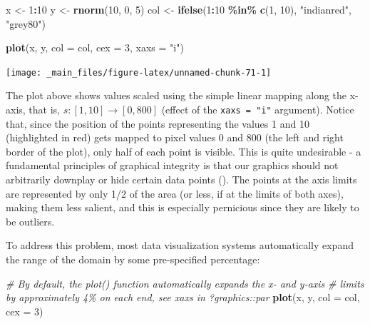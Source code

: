 \documentclass[
]{book}
\newenvironment{Shaded}{\begin{snugshade}}{\end{snugshade}}
\newcommand{\AttributeTok}[1]{\textcolor[rgb]{0.13,0.29,0.53}{#1}}
\newcommand{\CommentTok}[1]{\textcolor[rgb]{0.56,0.35,0.01}{\textit{#1}}}
\newcommand{\DecValTok}[1]{\textcolor[rgb]{0.00,0.00,0.81}{#1}}
\newcommand{\FunctionTok}[1]{\textcolor[rgb]{0.13,0.29,0.53}{\textbf{#1}}}
\newcommand{\NormalTok}[1]{#1}
\newcommand{\OtherTok}[1]{\textcolor[rgb]{0.56,0.35,0.01}{#1}}
\newcommand{\SpecialCharTok}[1]{\textcolor[rgb]{0.81,0.36,0.00}{\textbf{#1}}}
\newcommand{\StringTok}[1]{\textcolor[rgb]{0.31,0.60,0.02}{#1}}
\theoremstyle{definition}
\theoremstyle{definition}
\theoremstyle{definition}
\theoremstyle{definition}
\theoremstyle{remark}
\begin{document}
\begin{Shaded}
\begin{Highlighting}[]
\NormalTok{x }\OtherTok{\textless{}{-}} \DecValTok{1}\SpecialCharTok{:}\DecValTok{10}
\NormalTok{y }\OtherTok{\textless{}{-}} \FunctionTok{rnorm}\NormalTok{(}\DecValTok{10}\NormalTok{, }\DecValTok{0}\NormalTok{, }\DecValTok{5}\NormalTok{)}
\NormalTok{col }\OtherTok{\textless{}{-}} \FunctionTok{ifelse}\NormalTok{(}\DecValTok{1}\SpecialCharTok{:}\DecValTok{10} \SpecialCharTok{\%in\%} \FunctionTok{c}\NormalTok{(}\DecValTok{1}\NormalTok{, }\DecValTok{10}\NormalTok{), }\StringTok{"indianred"}\NormalTok{, }\StringTok{"grey80"}\NormalTok{)}

\FunctionTok{plot}\NormalTok{(x, y, }\AttributeTok{col =}\NormalTok{ col, }\AttributeTok{cex =} \DecValTok{3}\NormalTok{, }\AttributeTok{xaxs =} \StringTok{"i"}\NormalTok{)}
\end{Highlighting}
\end{Shaded}

\begin{center}\texttt{[image: \_main\_files/figure-latex/unnamed-chunk-71-1]} \end{center}

The plot above shows values scaled using the simple linear mapping along the x-axis, that is, \(s: [1, 10] \to [0, 800]\) (effect of the \texttt{xaxs\ =\ "i"} argument). Notice that, since the position of the points representing the values 1 and 10 (highlighted in red) gets mapped to pixel values 0 and 800 (the left and right border of the plot), only half of each point is visible. This is quite undesirable - a fundamental principles of graphical integrity is that our graphics should not arbitrarily downplay or hide certain data points (). The points at the axis limits are represented by only 1/2 of the area (or less, if at the limits of both axes), making them less salient, and this is especially pernicious since they are likely to be outliers.

To address this problem, most data visualization systems automatically expand the range of the domain by some pre-specified percentage:

\begin{Shaded}
\begin{Highlighting}[]
\CommentTok{\# By default, the plot() function automatically expands the x{-} and y{-}axis}
\CommentTok{\# limits by approximately 4\% on each end, see \textasciigrave{}xaxs\textasciigrave{} in ?graphics::par}
\FunctionTok{plot}\NormalTok{(x, y, }\AttributeTok{col =}\NormalTok{ col, }\AttributeTok{cex =} \DecValTok{3}\NormalTok{)}
\end{Highlighting}
\end{Shaded}
\end{document}
